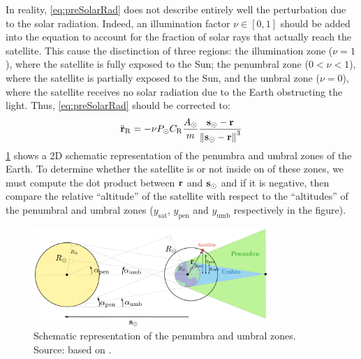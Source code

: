 \documentclass[../main.tex]{subfiles}
\begin{document}
In reality, \cref{eq:preSolarRad} does not describe entirely well the perturbation due to the solar radiation. Indeed, an illumination factor $\nu\in[0,1]$ should be added into the equation to account for the fraction of solar rays that actually reach the satellite. This cause the disctinction of three regions: the illumination zone ($\nu=1$), where the satellite is fully exposed to the Sun; the penumbral zone ($0<\nu<1$), where the satellite is partially exposed to the Sun, and the umbral zone ($\nu=0$), where the satellite receives no solar radiation due to the Earth obstructing the light.
Thus, \cref{eq:preSolarRad} should be corrected to:
\begin{equation}\label{eq:SolarRad}
  \ddot{\boldsymbol{\mathrm{r}}}_{\mathrm{R}}=-\nu P_{\odot} C_{\mathrm{R}} \frac{A_\odot}{m} \frac{\boldsymbol{\mathrm{s}}_\odot-\boldsymbol{\mathrm{r}}}{\left\|\boldsymbol{\mathrm{s}}_\odot-\boldsymbol{\mathrm{r}}\right\|^3}
\end{equation}
\cref{fig:penumbra} shows a 2D schematic representation of the penumbra and umbral zones of the Earth. To determine whether the satellite is or not inside on of these zones, we must compute the dot product between $\boldsymbol{\mathrm{r}}$ and $\boldsymbol{\mathrm{s}}_\odot$ and if it is negative, then compare the relative ``altitude'' of the satellite with respect to the ``altitudes'' of the penumbral and umbral zones ($y_\mathrm{sat}$, $y_{\mathrm{pen}}$ and $y_{\mathrm{umb}}$ respectively in the figure).
\begin{figure}[ht]
  \centering
  \includegraphics[width=0.8\textwidth]{Images/penumbra.pdf}
  \caption{Schematic representation of the penumbra and umbral zones. Source: based on \cite{vallado}.}
  \label{fig:penumbra}
\end{figure}
\end{document}
